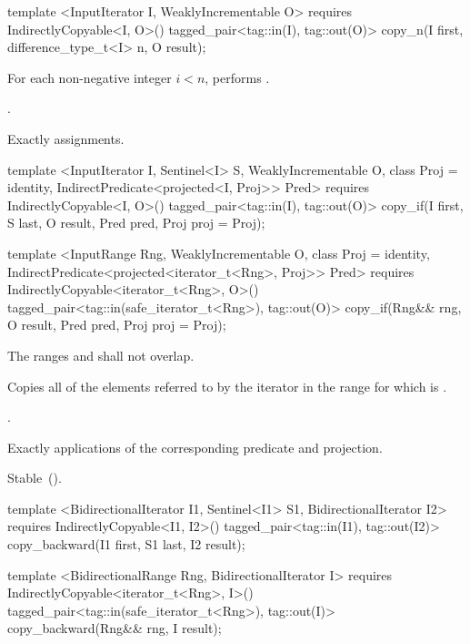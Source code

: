 %
\begin{itemdecl}
template <InputIterator I, WeaklyIncrementable O>
  requires IndirectlyCopyable<I, O>()
  tagged_pair<tag::in(I), tag::out(O)>
    copy_n(I first, difference_type_t<I> n, O result);
\end{itemdecl}

\begin{itemdescr}
\pnum
\effects For each non-negative integer
$i < n$, performs .

\pnum
\returns {}.

\pnum
\complexity Exactly  assignments.
\end{itemdescr}

%
\begin{itemdecl}
template <InputIterator I, Sentinel<I> S, WeaklyIncrementable O, class Proj = identity,
    IndirectPredicate<projected<I, Proj>> Pred>
  requires IndirectlyCopyable<I, O>()
  tagged_pair<tag::in(I), tag::out(O)>
    copy_if(I first, S last, O result, Pred pred, Proj proj = Proj{});

template <InputRange Rng, WeaklyIncrementable O, class Proj = identity,
    IndirectPredicate<projected<iterator_t<Rng>, Proj>> Pred>
  requires IndirectlyCopyable<iterator_t<Rng>, O>()
  tagged_pair<tag::in(safe_iterator_t<Rng>), tag::out(O)>
    copy_if(Rng&& rng, O result, Pred pred, Proj proj = Proj{});
\end{itemdecl}

\begin{itemdescr}
\pnum
\requires The ranges  and  shall not overlap.

\pnum
\effects Copies all of the elements referred to by the iterator  in the range 
for which  is .

\pnum
\returns {}.

\pnum
\complexity Exactly  applications of the corresponding predicate and projection.

\pnum
\remarks Stable~().
\end{itemdescr}


%
\begin{itemdecl}
template <BidirectionalIterator I1, Sentinel<I1> S1, BidirectionalIterator I2>
  requires IndirectlyCopyable<I1, I2>()
  tagged_pair<tag::in(I1), tag::out(I2)>
    copy_backward(I1 first, S1 last, I2 result);

template <BidirectionalRange Rng, BidirectionalIterator I>
  requires IndirectlyCopyable<iterator_t<Rng>, I>()
  tagged_pair<tag::in(safe_iterator_t<Rng>), tag::out(I)>
    copy_backward(Rng&& rng, I result);
\end{itemdecl}

